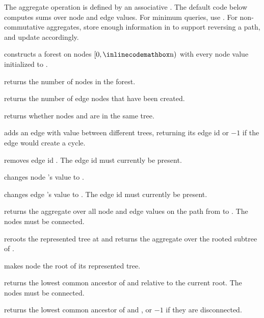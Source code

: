 The aggregate operation is defined by an associative . The default code below computes sums over node and edge values. For minimum queries, use . For non-commutative aggregates, store enough information in  to support reversing a path, and update  accordingly.

\begin{compactitem}
  \item {} constructs a forest on nodes $[0, {\inlinecodemath{n}})$ with every node value initialized to .
  \item {} returns the number of nodes in the forest.
  \item {} returns the number of edge nodes that have been created.
  \item {} returns whether nodes  and  are in the same tree.
  \item {} adds an edge with value  between different trees, returning its edge id or $-1$ if the edge would create a cycle.
  \item {} removes edge id . The edge id must currently be present.
  \item {} changes node 's value to .
  \item {} changes edge 's value to . The edge id must currently be present.
  \item {} returns the aggregate over all node and edge values on the path from  to . The nodes must be connected.
  \item {} reroots the represented tree at  and returns the aggregate over the rooted subtree of .
  \item {} makes node  the root of its represented tree.
  \item {} returns the lowest common ancestor of  and  relative to the current root. The nodes must be connected.
  \item {} returns the lowest common ancestor of  and , or $-1$ if they are disconnected.
\end{compactitem}

